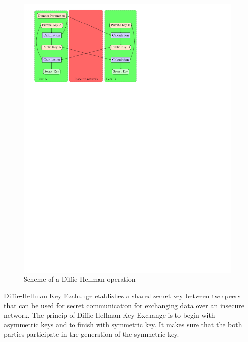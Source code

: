 \begin{figure}[!ht]
\centering
\includegraphics[trim=0cm 20cm 8cm 0cm]{figures/diffie_hellman.pdf}
\caption{Scheme of a Diffie-Hellman operation}
\label{fig:dh}

\end{figure}

Diffie-Hellman Key Exchange etablishes a shared secret key between two peers
that can be used for secret communication for exchanging data over an insecure
network.\newline
The princip of Diffie-Hellman Key Exchange is to begin with asymmetric keys and
to finish with symmetric key. \newline
It makes sure that the both parties
participate in the generation of the symmetric key.\newline


